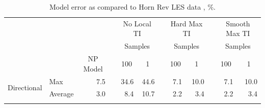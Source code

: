 \documentclass[conf]{new-aiaa}
\begin{document}
\begin{table}[htpb!]\centering
\caption{Model error as compared to Horn Rev LES data \cite{niayifar2016}, $\%$.}\label{tab:validation-error}
\begin{tabular}{@{}llrcrrcrrcrr@{}}\toprule
& & & & \multicolumn{2}{c}{No Local TI} &\phantom{a}& \multicolumn{2}{c}{Hard Max TI} &\phantom{a}& \multicolumn{2}{c}{Smooth Max TI}\\ 
\cmidrule{5-6} \cmidrule{8-9} \cmidrule{11-12}

& &  &  \phantom{a} & \multicolumn{2}{c}{Samples} & \phantom{a}&\multicolumn{2}{c}{Samples} & \phantom{a}&\multicolumn{2}{c}{Samples}\\ 

& & \multicolumn{1}{c}{NP Model} & \phantom{a} & \multicolumn{1}{c}{100} & \multicolumn{1}{c}{1} & \phantom{a} &\multicolumn{1}{c}{100} & \multicolumn{1}{c}{1} & \phantom{a} & \multicolumn{1}{c}{100} & \multicolumn{1}{c}{1} \\ 
 \cmidrule{3-3} \cmidrule{5-6} \cmidrule{8-9} \cmidrule{11-12}



\multicolumn{1}{c|}{\multirow{2}{*}{Directional}}  &  \multicolumn{1}{l}{Max} &7.5 & & 34.6  &44.6  & & 7.1 &10.0  & & 7.1 &10.0\\
\multicolumn{1}{c|}{} &  \multicolumn{1}{l}{Average} &3.0  & &8.4 &10.7 & & 2.2 &3.4 & & 2.2 &3.4\\

\\


\end{tabular}
\end{table}
\end{document}
